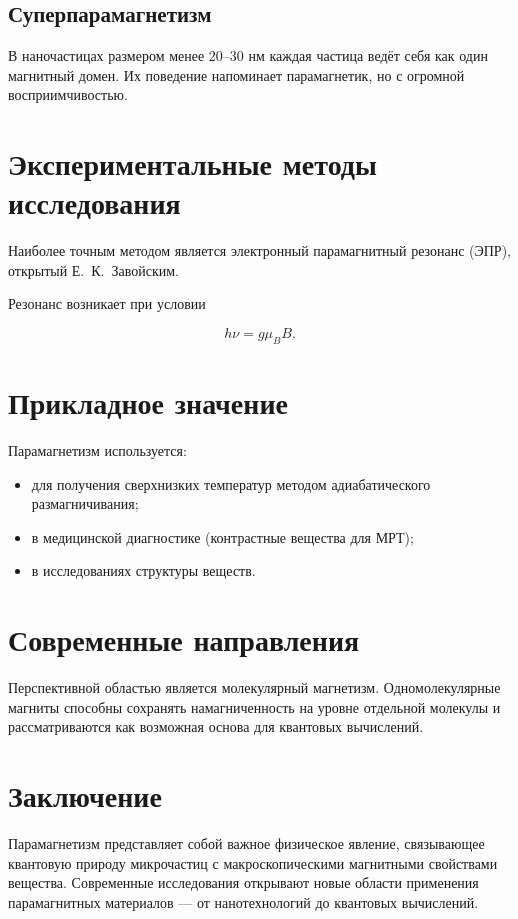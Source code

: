 \documentclass[a4paper,14pt]{extarticle}
\begin{document}
\subsection{Суперпарамагнетизм}

В наночастицах размером менее 20–30 нм каждая частица ведёт себя как один магнитный домен. Их поведение напоминает парамагнетик, но с огромной восприимчивостью.

\section{Экспериментальные методы исследования}

Наиболее точным методом является электронный парамагнитный резонанс (ЭПР), открытый Е.~К.~Завойским.

Резонанс возникает при условии

\[
h\nu = g\mu_B B.
\]

\section{Прикладное значение}

Парамагнетизм используется:

\begin{itemize}
\item для получения сверхнизких температур методом адиабатического размагничивания;
\item в медицинской диагностике (контрастные вещества для МРТ);
\item в исследованиях структуры веществ.
\end{itemize}

\section{Современные направления}

Перспективной областью является молекулярный магнетизм. Одномолекулярные магниты способны сохранять намагниченность на уровне отдельной молекулы и рассматриваются как возможная основа для квантовых вычислений.

\section{Заключение}

Парамагнетизм представляет собой важное физическое явление, связывающее квантовую природу микрочастиц с макроскопическими магнитными свойствами вещества. Современные исследования открывают новые области применения парамагнитных материалов — от нанотехнологий до квантовых вычислений.
\end{document}
